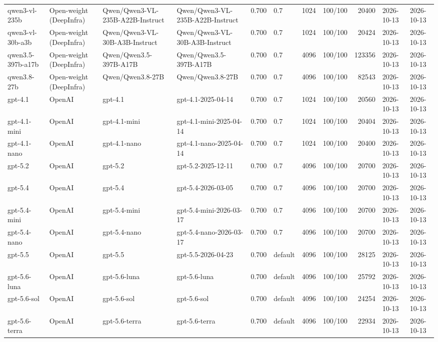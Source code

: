 \begin{table}
\begin{tabular}{llllrlrlrll}
qwen3-vl-235b & Open-weight (DeepInfra) & Qwen/Qwen3-VL-235B-A22B-Instruct & Qwen/Qwen3-VL-235B-A22B-Instruct & 0.700 & 0.7 & 1024 & 100/100 & 20400 & 2026-10-13 & 2026-10-13 \\
qwen3-vl-30b-a3b & Open-weight (DeepInfra) & Qwen/Qwen3-VL-30B-A3B-Instruct & Qwen/Qwen3-VL-30B-A3B-Instruct & 0.700 & 0.7 & 1024 & 100/100 & 20424 & 2026-10-13 & 2026-10-13 \\
qwen3.5-397b-a17b & Open-weight (DeepInfra) & Qwen/Qwen3.5-397B-A17B & Qwen/Qwen3.5-397B-A17B & 0.700 & 0.7 & 4096 & 100/100 & 123356 & 2026-10-13 & 2026-10-13 \\
qwen3.8-27b & Open-weight (DeepInfra) & Qwen/Qwen3.8-27B & Qwen/Qwen3.8-27B & 0.700 & 0.7 & 4096 & 100/100 & 82543 & 2026-10-13 & 2026-10-13 \\
gpt-4.1 & OpenAI & gpt-4.1 & gpt-4.1-2025-04-14 & 0.700 & 0.7 & 1024 & 100/100 & 20560 & 2026-10-13 & 2026-10-13 \\
gpt-4.1-mini & OpenAI & gpt-4.1-mini & gpt-4.1-mini-2025-04-14 & 0.700 & 0.7 & 1024 & 100/100 & 20404 & 2026-10-13 & 2026-10-13 \\
gpt-4.1-nano & OpenAI & gpt-4.1-nano & gpt-4.1-nano-2025-04-14 & 0.700 & 0.7 & 1024 & 100/100 & 20400 & 2026-10-13 & 2026-10-13 \\
gpt-5.2 & OpenAI & gpt-5.2 & gpt-5.2-2025-12-11 & 0.700 & 0.7 & 4096 & 100/100 & 20700 & 2026-10-13 & 2026-10-13 \\
gpt-5.4 & OpenAI & gpt-5.4 & gpt-5.4-2026-03-05 & 0.700 & 0.7 & 4096 & 100/100 & 20700 & 2026-10-13 & 2026-10-13 \\
gpt-5.4-mini & OpenAI & gpt-5.4-mini & gpt-5.4-mini-2026-03-17 & 0.700 & 0.7 & 4096 & 100/100 & 20700 & 2026-10-13 & 2026-10-13 \\
gpt-5.4-nano & OpenAI & gpt-5.4-nano & gpt-5.4-nano-2026-03-17 & 0.700 & 0.7 & 4096 & 100/100 & 20700 & 2026-10-13 & 2026-10-13 \\
gpt-5.5 & OpenAI & gpt-5.5 & gpt-5.5-2026-04-23 & 0.700 & default & 4096 & 100/100 & 28125 & 2026-10-13 & 2026-10-13 \\
gpt-5.6-luna & OpenAI & gpt-5.6-luna & gpt-5.6-luna & 0.700 & default & 4096 & 100/100 & 25792 & 2026-10-13 & 2026-10-13 \\
gpt-5.6-sol & OpenAI & gpt-5.6-sol & gpt-5.6-sol & 0.700 & default & 4096 & 100/100 & 24254 & 2026-10-13 & 2026-10-13 \\
gpt-5.6-terra & OpenAI & gpt-5.6-terra & gpt-5.6-terra & 0.700 & default & 4096 & 100/100 & 22934 & 2026-10-13 & 2026-10-13 \\

\end{tabular}
\end{table}
